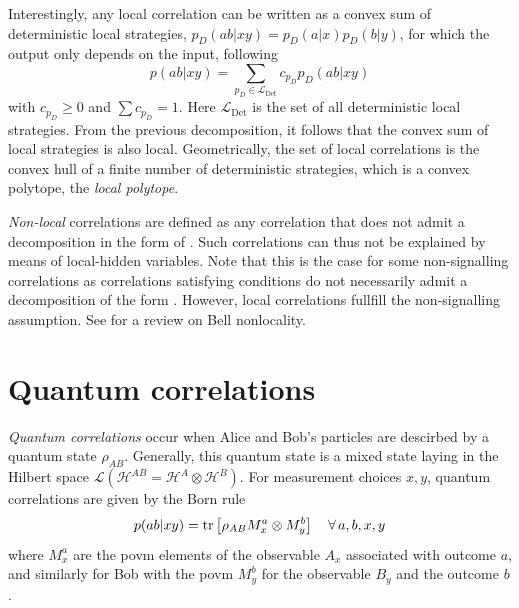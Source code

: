 Interestingly, any local correlation can be written as a convex sum of deterministic local strategies, $p_D(ab|xy)=p_D(a|x)p_D(b|y)$, for which the output only depends on the input, following
\begin{equation}
	p(ab|xy) = \sum_{p_D \in \mathcal{L}_\text{Det}} c_{p_D} p_D(ab|xy)
	\label{eq:polytope}
\end{equation}
with $c_{p_D}\geq 0$ and $\sum c_{p_D} = 1$. 
Here $\mathcal{L}_\text{Det}$ is the set of all deterministic local strategies.
From the previous decomposition, it follows that the convex sum of local strategies is also local. 
Geometrically, the set of local correlations is the convex hull of a finite number of deterministic strategies, which is a convex polytope, the \textit{local polytope}.

\medbreak

\textit{Non-local} correlations are defined as any correlation that does not admit a decomposition in the form of .
Such correlations can thus not be explained by means of local-hidden variables. 
Note that this is the case for some non-signalling correlations as correlations satisfying  conditions do not necessarily admit a decomposition of the form .
However, local correlations fullfill the non-signalling assumption. 
See \cite{Brunner14,Scarani2019} for a review on Bell nonlocality.

\section{Quantum correlations}

\textit{Quantum correlations} occur when Alice and Bob's particles are descirbed by a quantum state $\rho_{AB}$.
Generally, this quantum state is a mixed state laying in the Hilbert space $\mathcal{L}(\mathscr{H}^{AB} = \mathscr{H}^{A} \otimes \mathscr{H}^B)$.
For measurement choices $x,y$, quantum correlations are given by the Born rule
\begin{equation}
	p(ab|xy) = \trr{\rho_{AB} M^a_x \otimes M^b_y} \quad \forall\,a,b,x,y
	\label{eq:Born}
\end{equation}
where $M^a_x$ are the \acrfull{povm} elements of the observable $A_x$ associated with outcome $a$, and similarly for Bob with the \acrshort{povm} $M^b_y$ for the observable $B_y$ and the outcome $b$.

\medbreak

